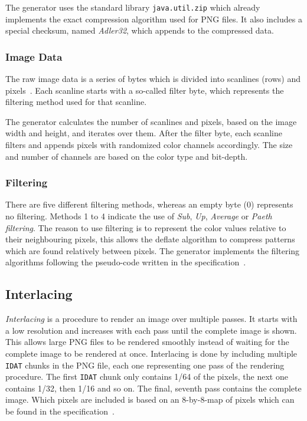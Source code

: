 \documentclass[runningheads]{llncs}
\begin{document}
The generator uses the standard library \texttt{java.util.zip} which already implements the exact compression algorithm used for PNG files. It also includes a special checksum, named \textit{Adler32}, which appends to the compressed data.
\subsubsection{Image Data}
The raw image data is a series of bytes which is divided into scanlines (rows) and pixels~\cite{libpng_data_representation}. 
Each scanline starts with a so-called filter byte, which represents the filtering method used for that scanline.

The generator calculates the number of scanlines and pixels, based on the image width and height, and iterates over them.
After the filter byte, each scanline filters and appends pixels with randomized color channels accordingly.
The size and number of channels are based on the color type and bit-depth.
\subsubsection{Filtering}
There are five different filtering methods, whereas an empty byte (0) represents no filtering. 
Methods 1 to 4 indicate the use of \textit{Sub}, \textit{Up}, \textit{Average} or \textit{Paeth filtering}.
The reason to use filtering is to represent the color values relative to their neighbouring pixels, this allows the deflate algorithm to compress patterns which are found relatively between pixels.
The generator implements the filtering algorithms following the pseudo-code written in the specification~\cite{libpng_filtering}.
\subsection{Interlacing}
\label{interlacing}
\textit{Interlacing} is a procedure to render an image over multiple passes. It starts with a low resolution and increases with each pass until the complete image is shown.
This allows large PNG files to be rendered smoothly instead of waiting for the complete image to be rendered at once.
Interlacing is done by including multiple \texttt{IDAT} chunks in the PNG file, each one representing one pass of the rendering procedure.
The first \texttt{IDAT} chunk only contains 1/64 of the pixels, the next one contains 1/32, then 1/16 and so on. The final, seventh pass contains the complete image.
Which pixels are included is based on an 8-by-8-map of pixels which can be found in the specification~\cite{libpng_data_representation}.
\end{document}
